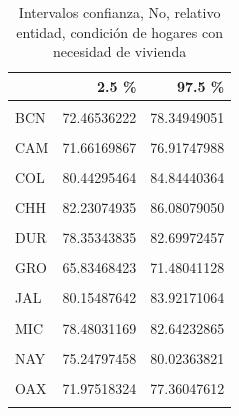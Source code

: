 \documentclass[
]{article}
\begin{document}
\begin{table}[H]

\caption{\label{tab:unnamed-chunk-21}Intervalos confianza, No, relativo entidad,
    condición de hogares con necesidad de vivienda}
\centering
\begin{tabular}[t]{lrr}
\toprule
  & 2.5 \% & 97.5 \%\\
\midrule
\cellcolor{gray!6}{AGU} & \cellcolor{gray!6}{82.47851681} & \cellcolor{gray!6}{86.05807469}\\
BCN & 72.46536222 & 78.34949051\\
\cellcolor{gray!6}{BCS} & \cellcolor{gray!6}{70.86666814} & \cellcolor{gray!6}{76.99255752}\\
CAM & 71.66169867 & 76.91747988\\
\cellcolor{gray!6}{COA} & \cellcolor{gray!6}{79.78679243} & \cellcolor{gray!6}{83.92016348}\\
\addlinespace
COL & 80.44295464 & 84.84440364\\
\cellcolor{gray!6}{CHP} & \cellcolor{gray!6}{70.02312064} & \cellcolor{gray!6}{74.80160846}\\
CHH & 82.23074935 & 86.08079050\\
\cellcolor{gray!6}{CMX} & \cellcolor{gray!6}{70.45010825} & \cellcolor{gray!6}{75.25466401}\\
DUR & 78.35343835 & 82.69972457\\
\addlinespace
\cellcolor{gray!6}{GUA} & \cellcolor{gray!6}{77.90473752} & \cellcolor{gray!6}{81.99305956}\\
GRO & 65.83468423 & 71.48041128\\
\cellcolor{gray!6}{HID} & \cellcolor{gray!6}{81.94184877} & \cellcolor{gray!6}{85.83100470}\\
JAL & 80.15487642 & 83.92171064\\
\cellcolor{gray!6}{MEX} & \cellcolor{gray!6}{79.39153600} & \cellcolor{gray!6}{83.48442066}\\
\addlinespace
MIC & 78.48031169 & 82.64232865\\
\cellcolor{gray!6}{MOR} & \cellcolor{gray!6}{79.31375490} & \cellcolor{gray!6}{83.82961646}\\
NAY & 75.24797458 & 80.02363821\\
\cellcolor{gray!6}{NLE} & \cellcolor{gray!6}{86.29192003} & \cellcolor{gray!6}{90.27070752}\\
OAX & 71.97518324 & 77.36047612\\
\addlinespace
\cellcolor{gray!6}{PUE} & \cellcolor{gray!6}{73.27526011} & \cellcolor{gray!6}{78.79321558}\\

\end{tabular}
\end{table}
\end{document}
